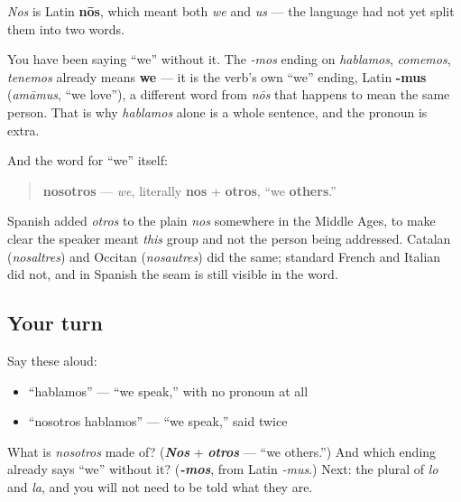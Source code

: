 \begin{cousinweb}
\emph{Nos} is Latin \textbf{nōs}, which meant both \emph{we} and \emph{us} — the language had not yet split them into two words.

You have been saying \textquotedblleft{}we\textquotedblright{} without it. The \emph{-mos} ending on \emph{hablamos}, \emph{comemos}, \emph{tenemos} already means \textbf{we} — it is the verb's own \textquotedblleft{}we\textquotedblright{} ending, Latin \textbf{-mus} (\emph{amāmus}, \textquotedblleft{}we love\textquotedblright{}), a different word from \emph{nōs} that happens to mean the same person. That is why \emph{hablamos} alone is a whole sentence, and the pronoun is extra.

And the word for \textquotedblleft{}we\textquotedblright{} itself:

\begin{quote}
\textbf{nosotros} — \emph{we}, literally \textbf{nos} + \textbf{otros}, \textquotedblleft{}we \textbf{others}.\textquotedblright{}
\end{quote}

Spanish added \emph{otros} to the plain \emph{nos} somewhere in the Middle Ages, to make clear the speaker meant \emph{this} group and not the person being addressed. Catalan (\emph{nosaltres}) and Occitan (\emph{nosautres}) did the same; standard French and Italian did not, and in Spanish the seam is still visible in the word.
\end{cousinweb}

\subsection*{Your turn}
Say these aloud:

\begin{itemize}
\raggedright
  \item \textquotedblleft{}hablamos\textquotedblright{} — \textquotedblleft{}we speak,\textquotedblright{} with no pronoun at all
  \item \textquotedblleft{}nosotros hablamos\textquotedblright{} — \textquotedblleft{}we speak,\textquotedblright{} said twice
\end{itemize}

\begin{tcolorbox}[breakable,colback=teal!4,colframe=teal!35!black,title={Before you move on}]
What is \emph{nosotros} made of? (\emph{\textbf{Nos}} + \emph{\textbf{otros}} — \textquotedblleft{}we others.\textquotedblright{}) And which ending already says \textquotedblleft{}we\textquotedblright{} without it? (\emph{\textbf{-mos}}, from Latin \emph{-mus}.) Next: the plural of \emph{lo} and \emph{la}, and you will not need to be told what they are.
\end{tcolorbox}
